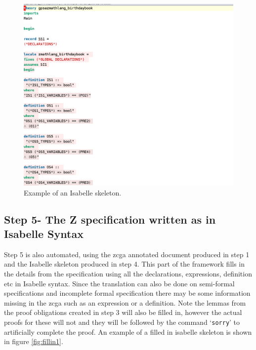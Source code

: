\begin{figure}[H]
 \begin{center}
 \includegraphics [scale=0.2]{Figures/Design/isaskeleton.png}
 \caption{Example of an Isabelle skeleton.}
 \label{fig:isaskelexample}
\end{center}
\end{figure} 

\subsection{Step 5- The Z specification written as in Isabelle Syntax}

Step 5 is also automated, using the \gls{zcga} annotated document produced in step 1 and the Isabelle skeleton produced in step 4. This part of the framework fills in the details from the specification using all the declarations, expressions, definition etc in Isabelle syntax. Since the translation can also be done on semi-formal specifications and incomplete formal specification there may be some information missing in the \gls{zcga} such as an expression or a definition. Note the lemmas from the proof obligations created in step 3 will also be filled in, however the actual proofs for these will not and they will be followed by the command `\texttt{sorry}' to artificially complete the proof. An example of a filled in isabelle skeleton is shown in figure \ref{fig:fillin1}.

